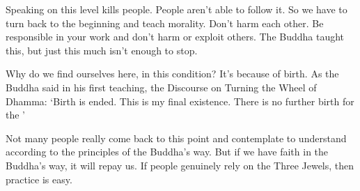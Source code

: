 Speaking on this level kills people. People aren't able to follow it. So we have to turn back to the beginning and teach morality. Don't harm each other. Be responsible in your work and don't harm or exploit others. The Buddha taught this, but just this much isn't enough to stop.

Why do we find ourselves here, in this condition? It's because of birth. As the Buddha said in his first teaching, the Discourse on Turning the Wheel of Dhamma: `Birth is ended. This is my final existence. There is no further birth for the '

Not many people really come back to this point and contemplate to understand according to the principles of the Buddha's way. But if we have faith in the Buddha's way, it will repay us. If people genuinely rely on the Three Jewels, then practice is easy.
